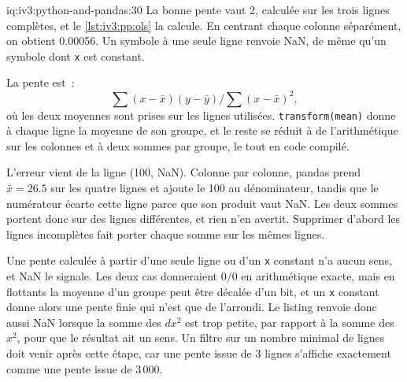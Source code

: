 \begin{solution}{iq:iv3:python-and-pandas:30}
La bonne pente vaut 2, calculée sur les trois lignes complètes, et le \cref{lst:iv3:pp:ols} la calcule. En centrant chaque colonne séparément, on obtient 0.00056. Un symbole à une seule ligne renvoie NaN, de même qu'un symbole dont \texttt{x} est constant.
\label{lst:iv3:pp:ols}

La pente est~:
\[ \sum (x - \bar x)(y - \bar y) \Big/ \sum (x - \bar x)^2, \]
où les deux moyennes sont prises sur les lignes utilisées. \texttt{transform(\textquotesingle mean\textquotesingle)} donne à chaque ligne la moyenne de son groupe, et le reste se réduit à de l'arithmétique sur les colonnes et à deux sommes par groupe, le tout en code compilé.

L'erreur vient de la ligne (100, NaN). Colonne par colonne, pandas prend $\bar x = 26.5$ sur les quatre lignes et ajoute le 100 au dénominateur, tandis que le numérateur écarte cette ligne parce que son produit vaut NaN. Les deux sommes portent donc sur des lignes différentes, et rien n'en avertit. Supprimer d'abord les lignes incomplètes fait porter chaque somme sur les mêmes lignes.

Une pente calculée à partir d'une seule ligne ou d'un \texttt{x} constant n'a aucun sens, et NaN le signale. Les deux cas donneraient $0 / 0$ en arithmétique exacte, mais en flottants la moyenne d'un groupe peut être décalée d'un bit, et un \texttt{x} constant donne alors une pente finie qui n'est que de l'arrondi. Le listing renvoie donc aussi NaN lorsque la somme des $dx^2$ est trop petite, par rapport à la somme des $x^2$, pour que le résultat ait un sens. Un filtre sur un nombre minimal de lignes doit venir après cette étape, car une pente issue de 3 lignes s'affiche exactement comme une pente issue de 3\,000.

\end{solution}

